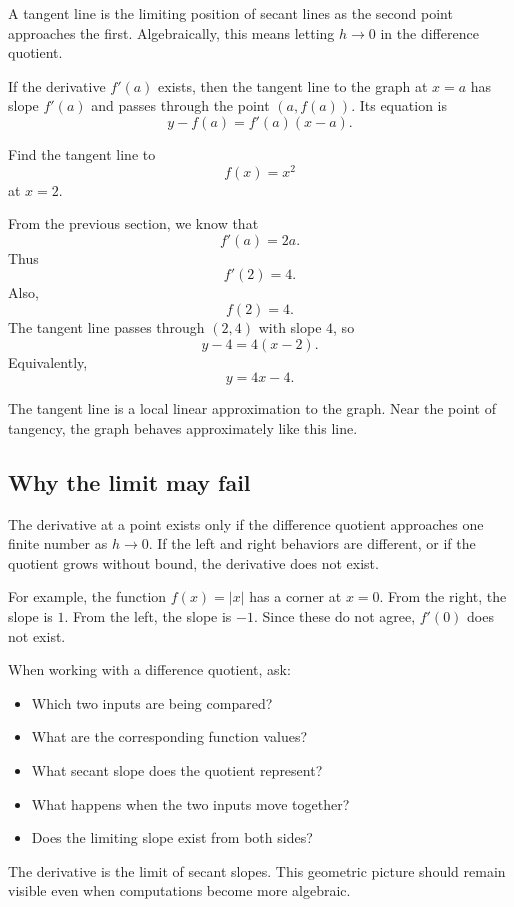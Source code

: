 A tangent line is the limiting position of secant lines as the second point approaches the first. Algebraically, this means letting \(h\to0\) in the difference quotient.

If the derivative \(f'(a)\) exists, then the tangent line to the graph at \(x=a\) has slope \(f'(a)\) and passes through the point \((a,f(a))\). Its equation is
\[
y-f(a)=f'(a)(x-a).
\]

\begin{examplebox}
Find the tangent line to
\[
f(x)=x^2
\]
at \(x=2\).

From the previous section, we know that
\[
f'(a)=2a.
\]
Thus
\[
f'(2)=4.
\]
Also,
\[
f(2)=4.
\]
The tangent line passes through \((2,4)\) with slope \(4\), so
\[
y-4=4(x-2).
\]
Equivalently,
\[
y=4x-4.
\]
\end{examplebox}

The tangent line is a local linear approximation to the graph. Near the point of tangency, the graph behaves approximately like this line.

\subsection*{Why the limit may fail}

The derivative at a point exists only if the difference quotient approaches one finite number as \(h\to0\). If the left and right behaviors are different, or if the quotient grows without bound, the derivative does not exist.

For example, the function \(f(x)=|x|\) has a corner at \(x=0\). From the right, the slope is \(1\). From the left, the slope is \(-1\). Since these do not agree, \(f'(0)\) does not exist.

\begin{summarybox}
When working with a difference quotient, ask:
\begin{itemize}
\item Which two inputs are being compared?
\item What are the corresponding function values?
\item What secant slope does the quotient represent?
\item What happens when the two inputs move together?
\item Does the limiting slope exist from both sides?
\end{itemize}
\end{summarybox}

The derivative is the limit of secant slopes. This geometric picture should remain visible even when computations become more algebraic.